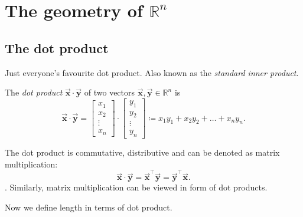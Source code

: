 \documentclass[12pt]{article}
\theoremstyle{remark}
\let\oldvec = \vec
\renewcommand{\vec}[1]{\oldvec{\mathbf{#1}}}
\numberwithin{equation}{section}
\begin{document}
\section{The geometry of $ \mathbb{R}^n $}%

\subsection{The dot product}%
\label{sub:The dot product}
Just everyone's favourite dot product. Also known as the \textit{standard inner product}.

\begin{definition}
	The \textit{dot product} $ \vec{x} \cdot \vec{y} $ of two vectors $ \vec{x}, \vec{y} \in \mathbb{R}^n $ is 
	\begin{equation}
		\vec{x} \cdot \vec{y} = 
		\begin{bmatrix}
			x_{1} \\
			x_{2} \\
			\vdots \\
			x_{n}
		\end{bmatrix}
                \cdot
		\begin{bmatrix}
			y_{1} \\
			y_{2} \\
			\vdots \\
			y_{n}
		\end{bmatrix}
		\coloneqq x_{1}y_{1} + x_{2}y_{2} + \ldots + x_{n}y_{n}.
	\end{equation}
\end{definition}

The dot product is commutative, distributive and can be denoted as matrix multiplication: 
\[ \vec{x} \cdot \vec{y} = \vec{x}^{\top} \vec{y} = \vec{y}^{\top} \vec{x}. \]. 
Similarly, matrix multiplication can be viewed in form of dot products. \par

Now we define length in terms of dot product. 

\begin{definition}
    
\end{definition}
\end{document}
